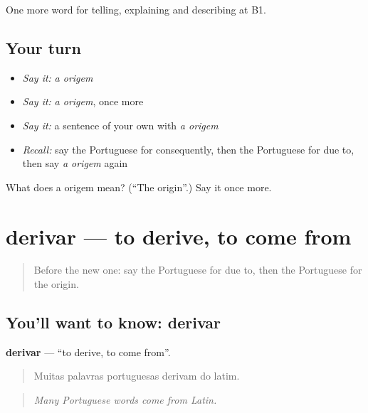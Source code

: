 \begin{grammarlens}[title={What you've built}]
One more word for telling, explaining and describing at B1.
\end{grammarlens}

\subsection*{Your turn}
\begin{itemize}
\raggedright
  \item \emph{Say it:} \emph{a origem}
  \item \emph{Say it:} \emph{a origem}, once more
  \item \emph{Say it:} a sentence of your own with \emph{a origem}
  \item \emph{Recall:} say the Portuguese for consequently, then the Portuguese for due to, then say \emph{a origem} again
\end{itemize}

\begin{tcolorbox}[breakable,colback=teal!4,colframe=teal!35!black,title={Before you move on}]
What does a origem mean? (\textquotedblleft{}The origin\textquotedblright{}.) Say it once more.
\end{tcolorbox}
\section[derivar]{derivar — to derive, to come from}

\label{lesson:PT-C350-derivar}



\begin{quote}
Before the new one: say the Portuguese for due to, then the Portuguese for the origin.
\end{quote}

\subsection*{You'll want to know: derivar}
\textbf{derivar} — \textquotedblleft{}to derive, to come from\textquotedblright{}.

\begin{quote}
Muitas palavras portuguesas derivam do latim.
\end{quote}

\begin{quote}
\emph{Many Portuguese words come from Latin.}
\end{quote}

